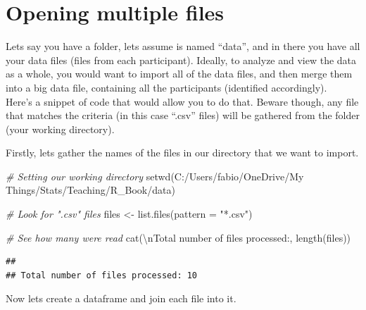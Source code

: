 \documentclass[
]{book}
\newenvironment{Shaded}{\begin{snugshade}}{\end{snugshade}}
\newcommand{\AttributeTok}[1]{\textcolor[rgb]{0.77,0.63,0.00}{#1}}
\newcommand{\CommentTok}[1]{\textcolor[rgb]{0.56,0.35,0.01}{\textit{#1}}}
\newcommand{\FunctionTok}[1]{\textcolor[rgb]{0.00,0.00,0.00}{#1}}
\newcommand{\NormalTok}[1]{#1}
\newcommand{\OtherTok}[1]{\textcolor[rgb]{0.56,0.35,0.01}{#1}}
\newcommand{\SpecialCharTok}[1]{\textcolor[rgb]{0.00,0.00,0.00}{#1}}
\newcommand{\StringTok}[1]{\textcolor[rgb]{0.31,0.60,0.02}{#1}}
\begin{document}
\hypertarget{opening-multiple-files}{%
\section{Opening multiple files}\label{opening-multiple-files}}

Lets say you have a folder, lets assume is named ``data'', and in there you have all your data files (files from each participant).
Ideally, to analyze and view the data as a whole, you would want to import all of the data files, and then merge them into a big data file, containing all the participants (identified accordingly).\\

Here's a snippet of code that would allow you to do that.
Beware though, any file that matches the criteria (in this case ``.csv'' files) will be gathered from the folder (your working directory).

Firstly, lets gather the names of the files in our directory that we want to import.

\begin{Shaded}
\begin{Highlighting}[]
\CommentTok{\# Setting our working directory}
\FunctionTok{setwd}\NormalTok{(}\StringTok{\textquotesingle{}C:/Users/fabio/OneDrive/My Things/Stats/Teaching/R\_Book/data\textquotesingle{}}\NormalTok{)}

\CommentTok{\# Look for ".csv" files}
\NormalTok{files }\OtherTok{\textless{}{-}} \FunctionTok{list.files}\NormalTok{(}\AttributeTok{pattern =} \StringTok{"*.csv"}\NormalTok{)}

\CommentTok{\# See how many were read}
\FunctionTok{cat}\NormalTok{(}\StringTok{\textquotesingle{}}\SpecialCharTok{\textbackslash{}n}\StringTok{Total number of files processed:\textquotesingle{}}\NormalTok{, }\FunctionTok{length}\NormalTok{(files))}
\end{Highlighting}
\end{Shaded}

\begin{verbatim}
## 
## Total number of files processed: 10
\end{verbatim}

Now lets create a dataframe and join each file into it.
\end{document}
